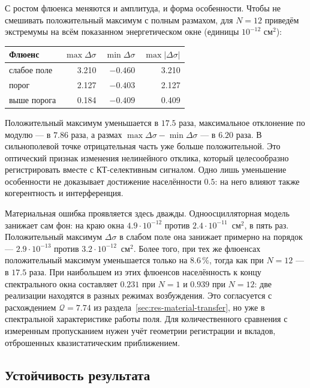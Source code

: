 С ростом флюенса меняются и амплитуда, и форма особенности. Чтобы не смешивать
положительный максимум с полным размахом, для $N=12$ приведём экстремумы
на всём показанном энергетическом окне (единицы $10^{-12}$ см$^2$):
\begin{center}\small
\begin{tabular}{lrrr}
  \toprule
  Флюенс & $\max\Delta\sigma$ & $\min\Delta\sigma$ & $\max|\Delta\sigma|$ \\
  \midrule
  слабое поле & 3.210 & $-0.460$ & 3.210 \\
  порог & 2.127 & $-0.403$ & 2.127 \\
  выше порога & 0.184 & $-0.409$ & 0.409 \\
  \bottomrule
\end{tabular}
\end{center}
Положительный максимум уменьшается в $17.5$ раза, максимальное отклонение
по модулю --- в $7.86$ раза, а размах $\max\Delta\sigma-\min\Delta\sigma$
--- в $6.20$ раза. В сильнополевой точке отрицательная часть уже больше
положительной. Это оптический признак изменения нелинейного отклика,
который целесообразно регистрировать
вместе с КТ-селективным сигналом. Одно лишь уменьшение особенности
не доказывает достижение населённости $0.5$: на него влияют также
когерентность и интерференция.

Материальная ошибка проявляется здесь дважды. Одноосцилляторная модель
занижает сам фон: на краю окна $4.9\cdot10^{-12}$ против
$2.4\cdot10^{-11}$~см$^2$, в пять раз. Положительный максимум
$\Delta\sigma$ в слабом поле она занижает примерно на порядок ---
$2.9\cdot10^{-13}$ против $3.2\cdot10^{-12}$~см$^2$. Более того, при тех же
флюенсах положительный максимум уменьшается только на $8.6\,\%$,
тогда как при $N=12$ --- в $17.5$ раза. При наибольшем из этих флюенсов
населённость к концу спектрального окна составляет $0.231$ при $N=1$
и $0.939$ при $N=12$: две реализации находятся в разных режимах возбуждения.
Это согласуется с расхождением
$\mathcal Q=7.74$ из раздела~\ref{sec:res-material-transfer}, но уже в
спектральной характеристике работы поля. Для количественного сравнения
с измеренным пропусканием нужен учёт геометрии регистрации и вкладов,
отброшенных квазистатическим приближением.

\subsection{Устойчивость результата}
\label{sec:res-stability}

